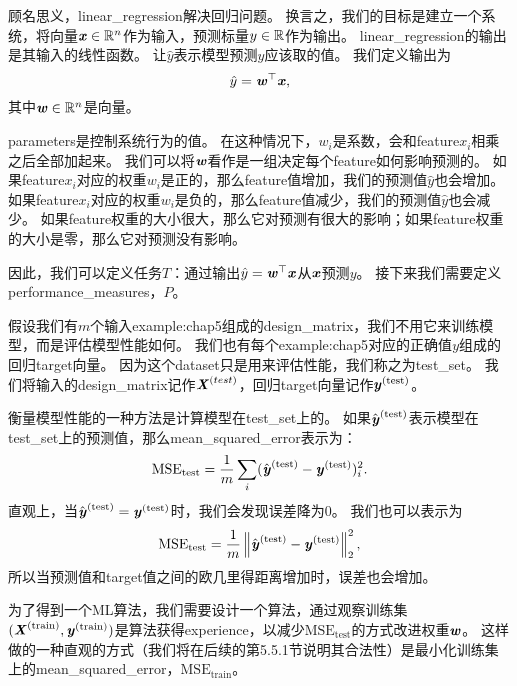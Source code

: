 顾名思义，\gls{linear_regression}解决回归问题。
换言之，我们的目标是建立一个系统，将向量$\boldsymbol{\mathit{x}}\in\mathbb{R}^n$作为输入，预测标量$y\in\mathbb{R}$作为输出。
\gls{linear_regression}的输出是其输入的线性函数。
让$\hat{y}$表示模型预测$y$应该取的值。
我们定义输出为
\begin{equation}
    \hat{y} = \boldsymbol{\mathit{w}}^\top \boldsymbol{\mathit{x}} ,
\end{equation}
其中$\boldsymbol{\mathit{w}}\in\mathbb{R}^n$是向量。

\gls{parameters}是控制系统行为的值。
在这种情况下，$w_i$是系数，会和\gls{feature}$x_i$相乘之后全部加起来。
我们可以将$\boldsymbol{\mathit{w}}$看作是一组决定每个\gls{feature}如何影响预测的。
如果\gls{feature}$x_i$对应的权重$w_i$是正的，那么\gls{feature}值增加，我们的预测值$\hat{y}$也会增加。
如果\gls{feature}$x_i$对应的权重$w_i$是负的，那么\gls{feature}值减少，我们的预测值$\hat{y}$也会减少。
如果\gls{feature}权重的大小很大，那么它对预测有很大的影响；如果\gls{feature}权重的大小是零，那么它对预测没有影响。


因此，我们可以定义任务$T$：通过输出$\hat{y} = \boldsymbol{\mathit{w}}^\top \boldsymbol{\mathit{x}}$从$\boldsymbol{\mathit{x}}$预测$y$。
接下来我们需要定义\gls{performance_measures}，$P$。

假设我们有$m$个输入\gls{example:chap5}组成的\gls{design_matrix}，我们不用它来训练模型，而是评估模型性能如何。
我们也有每个\gls{example:chap5}对应的正确值$y$组成的回归\gls{target}向量。
因为这个\gls{dataset}只是用来评估性能，我们称之为\gls{test_set}。
我们将输入的\gls{design_matrix}记作$\boldsymbol{\mathit{X}}^{\text(test)}$，回归\gls{target}向量记作$\boldsymbol{\mathit{y}}^{(\text{test})}$。

衡量模型性能的一种方法是计算模型在\gls{test_set}上的。
如果$\hat{\boldsymbol{\mathit{y}}}^{(\text{test})}$表示模型在\gls{test_set}上的预测值，那么\gls{mean_squared_error}表示为：
\begin{equation}
    \text{MSE}_{\text{test}} = \frac{1}{m} \sum_i ( \hat{\boldsymbol{\mathit{y}}}^{(\text{test})} - \boldsymbol{\mathit{y}}^{(\text{test})})_i^2.
\end{equation}
直观上，当$\hat{\boldsymbol{\mathit{y}}}^{(\text{test})} = \boldsymbol{\mathit{y}}^{(\text{test})}$时，我们会发现误差降为$0$。
我们也可以表示为
\begin{equation}
    \text{MSE}_{\text{test}} = \frac{1}{m} \left\lVert \hat{\boldsymbol{\mathit{y}}}^{(\text{test})} - \boldsymbol{\mathit{y}}^{(\text{test})}\right\rVert_2^2,
\end{equation}
所以当预测值和\gls{target}值之间的欧几里得距离增加时，误差也会增加。

为了得到一个\gls{ML}算法，我们需要设计一个算法，通过观察训练集$(\boldsymbol{\mathit{X}}^{(\text{train})},\boldsymbol{\mathit{y}}^{(\text{train})})$是算法获得\gls{experience}，以减少$\text{MSE}_{\text{test}}$的方式改进权重$\boldsymbol{\mathit{w}}$。
这样做的一种直观的方式（我们将在后续的第5.5.1节说明其合法性）是最小化训练集上的\gls{mean_squared_error}，$\text{MSE}_{\text{train}}$。

